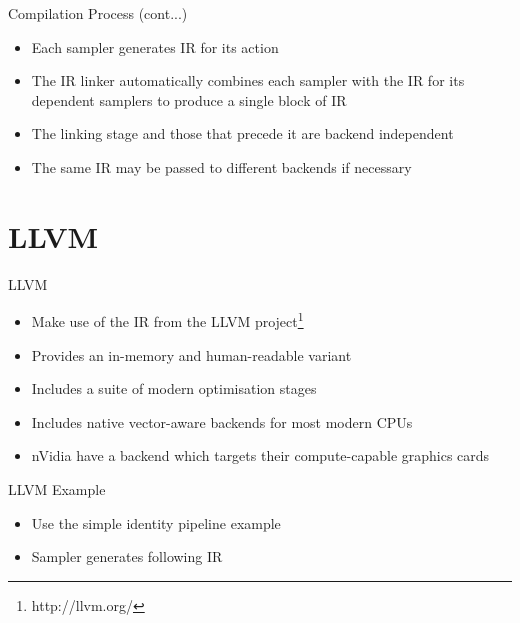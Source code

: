 \documentclass{beamer}
\newcommand{\bi}{\begin{itemize}}
\newcommand{\ei}{\end{itemize}}
\begin{document}
\begin{frame}{Compilation Process (cont...)}
  \bi
    \item Each sampler generates IR for its action
    \item The IR linker automatically combines each sampler with the IR for
    its dependent samplers to produce a single block of IR
    \item The linking stage and those that precede it are backend independent
    \item The same IR may be passed to different backends if necessary
  \ei
\end{frame}


\section{LLVM} %

\begin{frame}{LLVM}
  \bi
    \item Make use of the IR from the LLVM project\footnote{http://llvm.org/}
    \item Provides an in-memory and human-readable variant
    \item Includes a suite of modern optimisation stages
    \item Includes native vector-aware backends for most modern CPUs
    \item nVidia have a backend which targets their compute-capable graphics
    cards
  \ei
\end{frame}

\begin{frame}{LLVM Example}
  \bi
    \item Use the simple identity pipeline example
    
    \item Sampler generates following IR
    \scalebox{0.75}{}
  \ei
\end{frame}

\begin{frame}
    
    
\end{frame}
\end{document}
